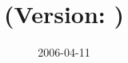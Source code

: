 %                                                                        
%                                                                        
%                                                                        
%                                                                        
%
\title{\projectname\\(Version: \projectversion)\\\projectdescription}
\author{\projectcredits}
\date{2006-04-11}
\maketitle
\thispagestyle{empty}
\vspace{6cm}
\begin{center}
\projectsupporters
\end{center}
